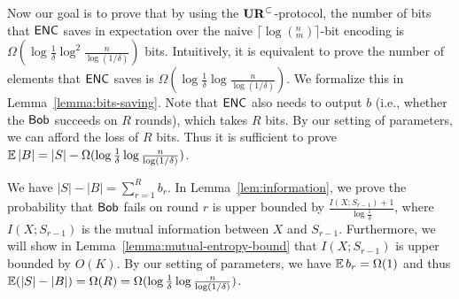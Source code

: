 Now our goal is to prove that by using the $\mathbf{UR}^\subset$-protocol, the number of bits that $\textsf{ENC}$ saves in expectation over the naive $\lceil\log(^n_m)\rceil$-bit encoding is $\Omega(\log \frac{1}{\delta}\log^2 \frac{n}{\log (1/\delta)} )$ bits.  Intuitively, it is equivalent to prove the number of elements that $\textsf{ENC}$ saves is $\Omega(\log \frac{1}{\delta}\log \frac{n}{\log (1/\delta)} )$.
We formalize this in Lemma~\ref{lemma:bits-saving}. 
Note that $\textsf{ENC}$ also needs to output $b$ (i.e., whether the $\mathsf{Bob}$ succeeds on $R$ rounds), which takes $R$ bits. 
By our setting of parameters, we can afford the loss of $R$ bits.  Thus it is sufficient to prove $\operatorname*{\mathbb{E}}|B|=|S|-\Omega(\log \frac{1}{\delta}\log \frac{n}{\log (1/\delta)})$. 

We have $|S|-|B|=\sum_{r=1}^{R}b_r$. 
In Lemma~\ref{lem:information}, we prove the probability that $\mathsf{Bob}$ fails on round $r$ is upper bounded by $\frac{I(X;S_{r-1})+1}{\log \frac{1}{\delta}}$, where $I(X;S_{r-1})$ is the mutual information between $X$ and $S_{r-1}$. 
Furthermore, we will show in Lemma~\ref{lemma:mutual-entropy-bound} that $I(X;S_{r-1})$ is upper bounded by $O(K)$.
By our setting of parameters, we have $\operatorname*{\mathbb{E}} b_r=\Omega(1)$ and thus $\operatorname*{\mathbb{E}}(|S|-|B|)=\Omega(R)=\Omega(\log \frac{1}{\delta}\log \frac{n}{\log (1/\delta)})$.
 
